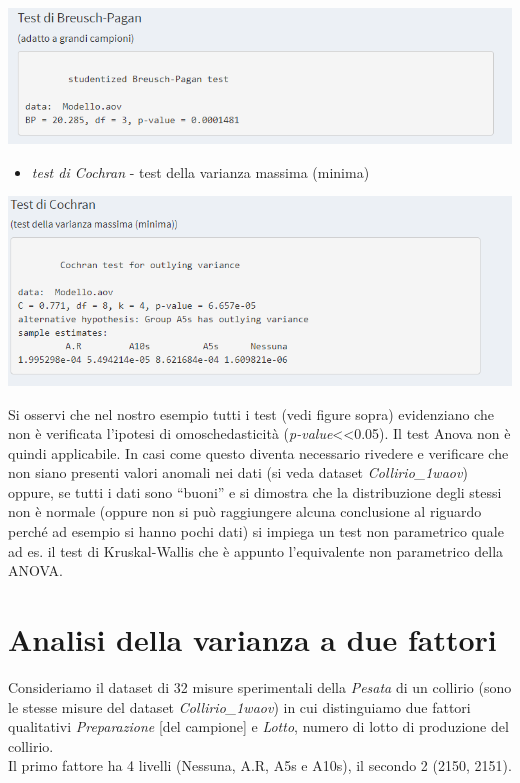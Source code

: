\documentclass[
  11pt,
]{book}
\providecommand{\tightlist}{%
  \setlength{\itemsep}{0pt}\setlength{\parskip}{0pt}}
\begin{document}
\begin{itemize}
  \begin{center}\includegraphics[width=0.5\linewidth]{Immagini/Anova/10_omo4} \end{center}

  \begin{itemize}
  \tightlist
  \item
    \emph{test di Cochran} - test della varianza massima (minima)
  \end{itemize}

  \begin{center}\includegraphics[width=0.5\linewidth]{Immagini/Anova/11_omo5} \end{center}
\end{itemize}

Si osservi che nel nostro esempio tutti i test (vedi figure sopra) evidenziano che non è verificata l'ipotesi di omoschedasticità (\emph{p-value}\textless\textless0.05).
Il test Anova non è quindi applicabile.
In casi come questo diventa necessario rivedere e verificare che non siano presenti valori anomali nei dati (si veda dataset \emph{Collirio\_1waov}) oppure, se tutti i dati sono ``buoni'' e si dimostra che la distribuzione degli stessi non è normale (oppure non si può raggiungere alcuna conclusione al riguardo perché ad esempio si hanno pochi dati) si impiega un test non parametrico quale ad es. il test di Kruskal-Wallis che è appunto l'equivalente non parametrico della ANOVA.

\hypertarget{analisi-della-varianza-a-due-fattori}{%
\section{Analisi della varianza a due fattori}\label{analisi-della-varianza-a-due-fattori}}

Consideriamo il dataset di 32 misure sperimentali della \emph{Pesata} di un collirio (sono le stesse misure del dataset \emph{Collirio\_1waov}) in cui distinguiamo due fattori qualitativi \emph{Preparazione} {[}del campione{]} e \emph{Lotto}, numero di lotto di produzione del collirio.\\
Il primo fattore ha 4 livelli (Nessuna, A.R, A5s e A10s), il secondo 2 (2150, 2151).
\end{document}
